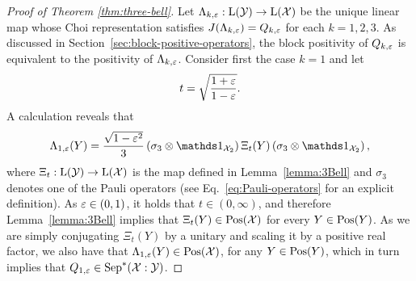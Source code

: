 \begin{proof}[Proof of Theorem \ref{thm:three-bell}]
  Let $\Lambda_{k, \varepsilon}: \mathrm{L}(\mathcal{Y}) \rightarrow \mathrm{L}(\mathcal{X})$ be the unique linear
  map whose Choi representation satisfies 
  $J(\Lambda_{k,\varepsilon}) = Q_{k, \varepsilon}$ for each $k = 1,2,3$.
  As discussed in Section~\ref{sec:block-positive-operators}, 
  the block positivity of $Q_{k, \varepsilon}$
  is equivalent to the positivity of $\Lambda_{k, \varepsilon}$.
  Consider first the case $k = 1$ and let
  \begin{equation}
    t = \sqrt{\frac{1+\varepsilon}{1-\varepsilon}}.
  \end{equation}
  A calculation reveals that
  \begin{equation}
    \Lambda_{1, \eps}(Y) = \frac{\sqrt{1 - \eps^{2}}}{3}
    \left(\sigma_{3} \otimes \I_{\X_2}\right)
    \Xi_{t}(Y)
    \left(\sigma_{3} \otimes \I_{\X_2}\right),
  \end{equation}
  where $\Xi_{t}:\mathrm{L}(\mathcal{Y})\rightarrow\mathrm{L}(\mathcal{X})$ is the map defined in
  Lemma~\ref{lemma:3Bell} and $\sigma_{3}$ denotes one of the Pauli operators
  (see Eq.~\eqref{eq:Pauli-operators} for an explicit definition).   
  As $\varepsilon \in (0,1)$, it holds that $t\in (0,\infty)$, and therefore
  Lemma~\ref{lemma:3Bell} implies that $\Xi_{t}(Y) \in \mathrm{Pos}(\mathcal{X})$ for every
  $Y \in \mathrm{Pos}(Y)$. 
  As we are simply conjugating $\Xi_{t}(Y)$ by a unitary and scaling it 
  by a positive real factor, we also have that 
  $\Lambda_{1, \varepsilon}(Y) \in \mathrm{Pos}(\mathcal{X})$, for any $Y \in \mathrm{Pos}(Y)$, which in turn
  implies that $Q_{1, \varepsilon} \in \mathrm{Sep}^{\ast}(\mathcal{X}:\mathcal{Y})$.


\end{proof}
